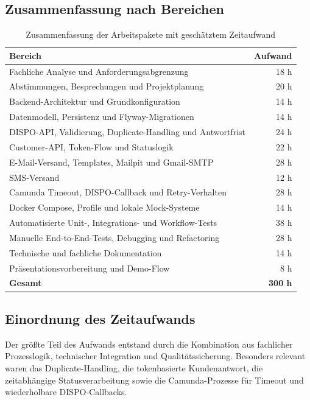 \documentclass[
12pt,
a4paper,
oneside
]{article}
\begin{document}
\subsection{Zusammenfassung nach Bereichen}

\begin{table}[H]
	\centering
	\begin{tabular}{p{}r}
		\hline
		\textbf{Bereich} & \textbf{Aufwand} \\
		\hline
		Fachliche Analyse und Anforderungsabgrenzung & 18 h \\
		Abstimmungen, Besprechungen und Projektplanung & 20 h \\
		Backend-Architektur und Grundkonfiguration & 14 h \\
		Datenmodell, Persistenz und Flyway-Migrationen & 14 h \\
		DISPO-API, Validierung, Duplicate-Handling und Antwortfrist & 24 h \\
		Customer-API, Token-Flow und Statuslogik & 22 h \\
		E-Mail-Versand, Templates, Mailpit und Gmail-SMTP & 28 h \\
		SMS-Versand & 12 h \\
		Camunda Timeout, DISPO-Callback und Retry-Verhalten & 28 h \\
		Docker Compose, Profile und lokale Mock-Systeme & 14 h \\
		Automatisierte Unit-, Integrations- und Workflow-Tests & 38 h \\
		Manuelle End-to-End-Tests, Debugging und Refactoring & 28 h \\
		Technische und fachliche Dokumentation & 14 h \\
		Pr\"asentationsvorbereitung und Demo-Flow & 8 h \\
		\hline
		\textbf{Gesamt} & \textbf{300 h} \\
		\hline
	\end{tabular}
	\caption{Zusammenfassung der Arbeitspakete mit gesch\"atztem Zeitaufwand}
\end{table}

\subsection{Einordnung des Zeitaufwands}

Der gr\"o{\ss}te Teil des Aufwands entstand durch die Kombination aus fachlicher Prozesslogik, technischer Integration und Qualit\"atssicherung. Besonders relevant waren das Duplicate-Handling, die tokenbasierte Kundenantwort, die zeitabh\"angige Statusverarbeitung sowie die Camunda-Prozesse f\"ur Timeout und wiederholbare DISPO-Callbacks.
\end{document}
